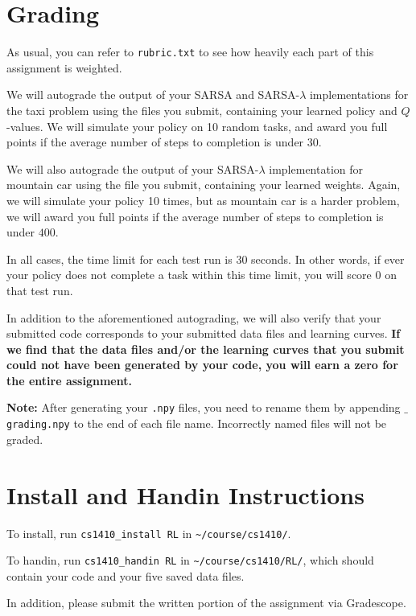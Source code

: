 \documentclass{article}
\newcommand{\amy}[1]{{\color{blue}[Amy: #1]}}
\newcommand{\matt}[1]{{\color{magenta}[Matt: #1]}}
\begin{document}
\section{Grading}
As usual, you can refer to \verb|rubric.txt| to see how heavily each
part of this assignment is weighted.

We will autograde the output of your SARSA and SARSA-$\lambda$
implementations for the taxi problem using the files you submit,
containing your learned policy and $Q$-values.  We will simulate your
policy on 10 random tasks, and award you full points if the average number
of steps to completion is under $30$.

We will also autograde the output of your SARSA-$\lambda$
implementation for mountain car using the file you submit, containing
your learned weights.  Again, we will simulate your policy 10 times,
but as mountain car is a harder problem, we will award you full points
if the average number of steps to completion is under $400$.

In all cases, the time limit for each test run is 30 seconds.  In
other words, if ever your policy does not complete a task within
this time limit, you will score 0 on that test run.

In addition to the aforementioned autograding, we will also verify
that your submitted code corresponds to your submitted data files and
learning curves.  \textbf{If we find that the data files and/or the
  learning curves that you submit could not have been generated by
  your code, you will earn a zero for the entire assignment.}

\textbf{Note:} After generating your \texttt{.npy} files, you need to rename
them by appending \texttt{$\_$grading.npy} to the end of each file name.
Incorrectly named files will not be graded.


\section{Install and Handin Instructions}
To install, run \verb|cs1410_install RL| in \verb|~/course/cs1410/|.

To handin, run \verb|cs1410_handin RL| in \verb|~/course/cs1410/RL/|,
which should contain your code and your five saved data files.

In addition, please submit the written portion of the assignment via Gradescope.
\end{document}
